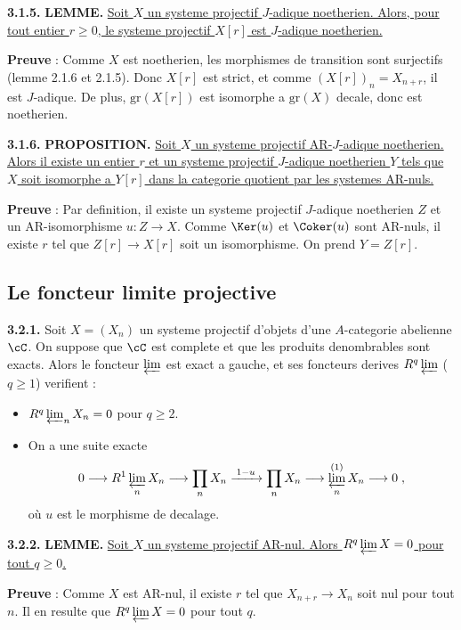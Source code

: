 \medskip
\noindent\textbf{3.1.5.} \textbf{LEMME.} \underline{Soit $X$ un systeme projectif $J$-adique noetherien. Alors, pour tout entier $r \geq 0$, le systeme projectif $X[r]$ est $J$-adique noetherien.}

\textbf{Preuve} : Comme $X$ est noetherien, les morphismes de transition sont surjectifs (lemme 2.1.6 et 2.1.5). Donc $X[r]$ est strict, et comme $(X[r])_n = X_{n+r}$, il est $J$-adique. De plus, $\mathrm{gr}(X[r])$ est isomorphe a $\mathrm{gr}(X)$ decale, donc est noetherien.

\medskip
\noindent\textbf{3.1.6.} \textbf{PROPOSITION.} \underline{Soit $X$ un systeme projectif AR-$J$-adique noetherien. Alors il existe un entier $r$ et un systeme projectif $J$-adique noetherien $Y$ tels que $X$ soit isomorphe a $Y[r]$ dans la categorie quotient par les systemes AR-nuls.}

\textbf{Preuve} : Par definition, il existe un systeme projectif $J$-adique noetherien $Z$ et un AR-isomorphisme $u : Z \longrightarrow X$. Comme $\Ker(u)$ et $\Coker(u)$ sont AR-nuls, il existe $r$ tel que $Z[r] \longrightarrow X[r]$ soit un isomorphisme. On prend $Y = Z[r]$.

\subsection{Le foncteur limite projective}

\medskip
\noindent\textbf{3.2.1.} Soit $X = (X_n)$ un systeme projectif d'objets d'une $A$-categorie abelienne $\cC$. On suppose que $\cC$ est complete et que les produits denombrables sont exacts. Alors le foncteur $\varprojlim$ est exact a gauche, et ses foncteurs derives $R^q \varprojlim$ ($q \geq 1$) verifient :
\begin{itemize}
\item[(i)] $R^q \varprojlim_n X_n = 0$ pour $q \geq 2$.
\item[(ii)] On a une suite exacte
\[
0 \longrightarrow R^1 \varprojlim_n X_n \longrightarrow \prod_n X_n \xrightarrow{\;1-u\;} \prod_n X_n \longrightarrow \varprojlim_n^{(1)} X_n \longrightarrow 0\;,
\]
où $u$ est le morphisme de decalage.
\end{itemize}

\medskip
\noindent\textbf{3.2.2.} \textbf{LEMME.} \underline{Soit $X$ un systeme projectif AR-nul. Alors $R^q \varprojlim X = 0$ pour tout $q \geq 0$.}

\textbf{Preuve} : Comme $X$ est AR-nul, il existe $r$ tel que $X_{n+r} \longrightarrow X_n$ soit nul pour tout $n$. Il en resulte que $R^q \varprojlim X = 0$ pour tout $q$.

